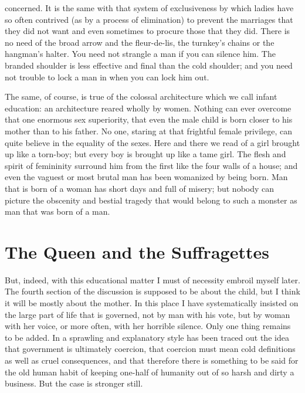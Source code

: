 \documentclass{book}
\begin{document}
concerned. It is the same with that system of exclusiveness by which ladies have so often contrived (as by a process of elimination) to prevent the marriages that they did not want and even sometimes to procure those that they did. There is no need of the broad arrow and the fleur-de-lis, the turnkey’s chains or the hangman’s halter. You need not strangle a man if you can silence him. The branded shoulder is less effective and final than the cold shoulder; and you need not trouble to lock a man in when you can lock him out.

The same, of course, is true of the colossal architecture which we call infant education: an architecture reared wholly by women. Nothing can ever overcome that one enormous sex superiority, that even the male child is born closer to his mother than to his father. No one, staring at that frightful female privilege, can quite believe in the equality of the sexes. Here and there we read of a girl brought up like a torn-boy; but every boy is brought up like a tame girl. The flesh and spirit of femininity surround him from the first like the four walls of a house; and even the vaguest or most brutal man has been womanized by being born. Man that is born of a woman has short days and full of misery; but nobody can picture the obscenity and bestial tragedy that would belong to such a monster as man that was born of a man.

\chapter{The Queen and the Suffragettes}
\label{chapter-29}
But, indeed, with this educational matter I must of necessity embroil myself later. The fourth section of the discussion is supposed to be about the child, but I think it will be mostly about the mother. In this place I have systematically insisted on the large part of life that is governed, not by man with his vote, but by woman with her voice, or more often, with her horrible silence. Only one thing remains to be added. In a sprawling and explanatory style has been traced out the idea that government is ultimately coercion, that coercion must mean cold definitions as well as cruel consequences, and that therefore there is something to be said for the old human habit of keeping one-half of humanity out of so harsh and dirty a business. But the case is stronger still.
\end{document}
